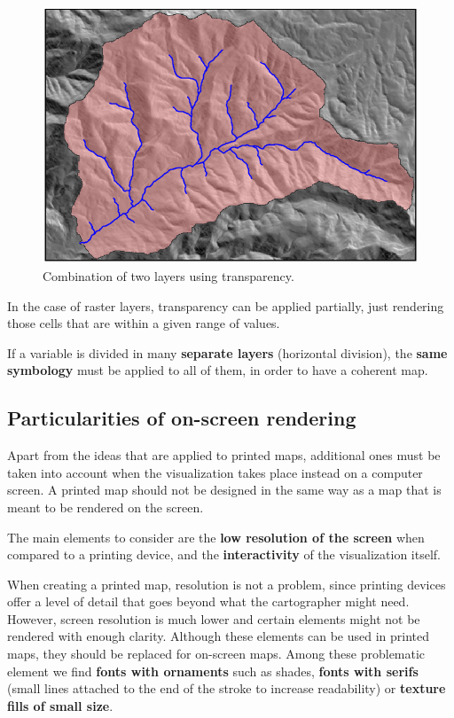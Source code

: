 \begin{figure}[!hbt]
\centering
\includegraphics[width=.7\columnwidth]{Visualization/Transparency.png}
\caption{\small Combination of two layers using transparency.}
\label{Fig:Transparency} 
\end{figure}

In the case of raster layers, transparency can be applied partially, just rendering those cells that are within a given range of values.

If a variable is divided in many \textbf{separate layers} (horizontal division), the \textbf{same symbology} must be applied to all of them, in order to have a coherent map.


\subsection{Particularities of on-screen rendering}

Apart from the ideas that are applied to printed maps, additional ones must be taken into account when the visualization takes place instead on a computer screen. A printed map should not be designed in the same way as a map that is meant to be rendered on the screen.

The main elements to consider are the \textbf{low resolution of the screen} when compared to a printing device, and the \textbf{interactivity} of the visualization itself.

When creating a printed map, resolution is not a problem, since printing devices offer a level of detail that goes beyond what the cartographer might need. However, screen resolution is much lower and certain elements might not be rendered with enough clarity. Although these elements can be used in printed maps, they should be replaced for on-screen maps. Among these problematic element we find \textbf{fonts with ornaments} such as shades, \textbf{fonts with serifs} (small lines attached to the end of the stroke to increase readability) or \textbf{texture fills of small size}.

